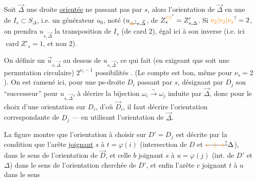 Soit $\vec\Delta$ une droite \uline{orientée} ne passant pas
par $s$, alors l'orientation de $\vec\Delta$ en  une
de $I_s\subset S_\Delta$, i.e. un générateur $u_0$, noté
$(u_{\deleted{\unsure{\Delta}}s,\vec\Delta}$, de $Z_s^{\unsure{\prime|1}}=Z'_{s,\Delta}$. Si $\unsure{\nu_2|v_2|\nu_s}=2$, on prendra
$u_{s,\vec\Delta}$ la transposition de $I_s$ (de card 2), égal
ici à son inverse (i.e.  ici $\operatorname{card} Z'_s=1$, et non 2).

On   définir un $\vec u_{s,\vec\Delta}$ au dessus de
 $u_{s,\vec\Delta}$, ce qui fait (en exigeant que
soit une permutation circulaire)  $2^{\nu_s-1}$ 
possibilités . (Le compte est bon, même pour
$\nu_s=2$). On est ramené ici, pour une ps-droite
$D_i$ passant par $s$, désignant par
$D_j$ son ``successeur'' pour $u_{s,\vec\Delta}$, à décrire
la bijection $\omega_i\xrightarrow{\sim}\omega_j$ induite par $\vec\Delta$,
donc pour le choix d'une
orientation sur  $D_i$, d'où
$\vec D_i$, il faut décrire
l'orientation correspondante de $D_j$ — en utilisant
l'orientation de $\vec\Delta$.

La figure montre que l'orientation à choisir sur
$D'=D_j$ est décrite par la condition que l'arête  \uline{joignant}
$s$ à $t=\varphi(i)$ (intersection de $D$ et $\deleted{\unsure{\leftarrow|\rightarrow}}\Delta$), dans le sens
de l'orientation  de $\vec D$, et celle $b$ joignant $s$ à $u=\varphi(j)$
(int. de $D'$ et $\Delta$) dans le sens de l'orientation cherchée de
$D'$, et enfin l'arête $c$ joignant $t$ à $u$ dans le sens

